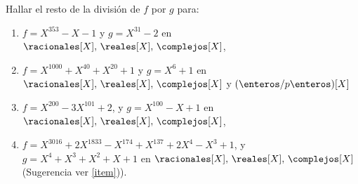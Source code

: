 \begin{enunciado}{\ejercicio}

Hallar el resto de la división de $f$ por $g$ para:

\begin{enumerate}[label=\roman*)]
	\item $f = X^{353} - X - 1$ y $g = X^{31} - 2$ en $\racionales[X],\,\reales[X],\,\complejos[X]$,

	\item $f = X^{1000} + X^{40} + X^{20}  + 1$ y $g = X^6 + 1$ en $\racionales[X],\,\reales[X],\,\complejos[X]$ y $(\enteros/p\enteros)[X]$

	\item $f = X^{200} - 3X^{101} + 2$, y $g = X^{100} - X + 1$ en $\racionales[X],\,\reales[X],\,\complejos[X]$,

	\item $f = X^{3016} + 2X^{1833} - X^{174} + X^{137} + 2X^4 - X^3 + 1$, y $g = X^4 + X^3 +X^2 + X + 1$ en $\racionales[X],\,\reales[X],\,\complejos[X]$
	      (Sugerencia ver  \ref{item})).
\end{enumerate}

\end{enunciado}

